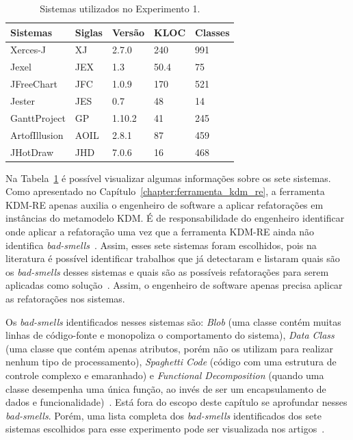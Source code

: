 \begin{table}[h]
\centering
\caption{Sistemas utilizados no Experimento 1.}
\label{tab:sistemas_experimentos}
\begin{tabular}{ | m{2cm} | m{1cm}| m{1cm}| m{1cm} | m{1cm} | } 
\hline
Sistemas & Siglas & Versão & KLOC & Classes \\ 
\hline
Xerces-J & XJ & 2.7.0 & 240 & 991\\ 
\hline
Jexel & JEX & 1.3 & 50.4 & 75\\
\hline
JFreeChart & JFC & 1.0.9 & 170 & 521\\ 
\hline
Jester & JES & 0.7 & 48 & 14\\ 
\hline
GanttProject & GP & 1.10.2 & 41 & 245\\ 
\hline
ArtofIllusion & AOIL &  2.8.1 & 87 & 459\\ 
\hline
JHotDraw & JHD & 7.0.6 & 16 & 468 \\ 
\hline
\end{tabular}
\end{table}

Na Tabela~\ref{tab:sistemas_experimentos} é possível visualizar algumas informações sobre os sete sistemas. Como apresentado no Capítulo~\ref{chapter:ferramenta_kdm_re}, a ferramenta KDM-RE apenas auxilia o engenheiro de software a aplicar refatorações em instâncias do metamodelo KDM. É de responsabilidade do engenheiro identificar onde aplicar a refatoração uma vez que a ferramenta KDM-RE ainda não identifica \textit{bad-smells}~\cite{Fowler1999}. Assim, esses sete sistemas foram escolhidos, pois na literatura é possível identificar trabalhos que já detectaram e listaram quais são os \textit{bad-smells} desses sistemas e quais são as possíveis refatorações para serem aplicadas como solução~\cite{Kessentini_2011, Ouni_2013, Moha_2010, Kessentini_2010}. Assim, o engenheiro de software apenas precisa aplicar as refatorações nos sistemas.  


Os \textit{bad-smells} identificados nesses sistemas são: \textit{Blob} (uma classe contém muitas linhas de código-fonte e monopoliza o comportamento do sistema), \textit{Data Class} (uma classe que contém apenas atributos, porém não os utilizam para realizar nenhum tipo de processamento), \textit{Spaghetti Code} (código com uma estrutura de controle complexo e emaranhado) e \textit{Functional Decomposition} (quando uma classe desempenha uma única função, ao invés de ser um encapsulamento de dados e funcionalidade)~\cite{Fowler1999}. Está fora do escopo deste capítulo se aprofundar nesses \textit{bad-smells}. Porém, uma lista completa dos \textit{bad-smells} identificados dos sete sistemas escolhidos para esse experimento pode ser visualizada nos artigos~\cite{Kessentini_2011, Ouni_2013, Moha_2010, Kessentini_2010}.

